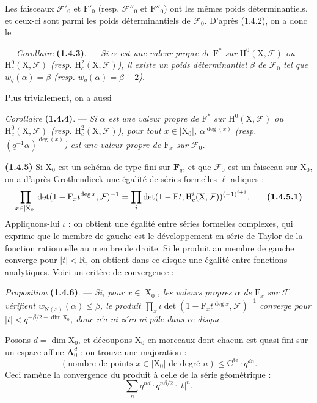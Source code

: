\documentclass[11pt,leqno]{article}
\newcommand{\Page}[1]{\ifvmode\noindent\else\unskip\ \fi{\footnotesize\textcolor{gray}{[p.\,#1]}}\ \ignorespaces}
\begin{document}
Les faisceaux \(\mathcal{F}'_0\) et \(\mathrm{F}'_0\) (resp. \(\mathcal{F}''_0\) et \(\mathrm{F}''_0\)) ont les mêmes poids déterminantiels, et ceux-ci sont parmi les poids déterminantiels de \(\mathcal{F}_0\). D’après (1.4.2), on a donc le

\Page{163}
\textit{Corollaire} \textbf{(1.4.3)}. — \textit{Si \(\alpha\) est une valeur propre de \(\mathrm{F}^*\) sur \(\mathrm{H}^0(\mathrm{X},\mathcal{F})\) ou \(\mathrm{H}_c^0(\mathrm{X},\mathcal{F})\) (resp. \(\mathrm{H}_c^2(\mathrm{X},\mathcal{F})\)), il existe un poids déterminantiel \(\beta\) de \(\mathcal{F}_0\) tel que \(w_q(\alpha)=\beta\) (resp. \(w_q(\alpha)=\beta+2\)).}

Plus trivialement, on a aussi

\textit{Corollaire} \textbf{(1.4.4)}. — \textit{Si \(\alpha\) est une valeur propre de \(\mathrm{F}^*\) sur \(\mathrm{H}^0(\mathrm{X},\mathcal{F})\) ou \(\mathrm{H}_c^0(\mathrm{X},\mathcal{F})\) (resp. \(\mathrm{H}_c^2(\mathrm{X},\mathcal{F})\)), pour tout \(x\in|\mathrm{X}_0|\), \(\alpha^{\deg(x)}\) (resp. \((q^{-1}\alpha)^{\deg(x)}\)) est une valeur propre de \(\mathrm{F}_x\) sur \(\mathcal{F}_0\).}

\textbf{(1.4.5)} Si \(\mathrm{X}_0\) est un schéma de type fini sur \(\mathbf{F}_q\), et que \(\mathcal{F}_0\) est un faisceau sur \(\mathrm{X}_0\), on a d’après Grothendieck une égalité de séries formelles \(\ell\)-adiques :
\[
\prod_{x\in|\mathrm{X}_0|}
\det(1-\mathrm{F}_x t^{\deg x},\mathcal{F})^{-1}
=
\prod_i\det(1-\mathrm{F}t,\mathrm{H}_c^i(\mathrm{X},\mathcal{F}))^{(-1)^{i+1}}.
\tag*{\textbf{(1.4.5.1)}}
\]
Appliquons-lui \(\iota\) : on obtient une égalité entre séries formelles complexes, qui exprime que le membre de gauche est le développement en série de Taylor de la fonction rationnelle au membre de droite. Si le produit au membre de gauche converge pour \(|t|<\mathrm{R}\), on obtient dans ce disque une égalité entre fonctions analytiques. Voici un critère de convergence :

\textit{Proposition} \textbf{(1.4.6)}. — \textit{Si, pour \(x\in|\mathrm{X}_0|\), les valeurs propres \(\alpha\) de \(\mathrm{F}_x\) sur \(\mathcal{F}\) vérifient \(w_{\mathrm{N}(x)}(\alpha)\le\beta\), le produit \(\prod_x\iota\det(1-\mathrm{F}_x t^{\deg x},\mathcal{F})^{-1}\) converge pour \(|t|<q^{-\beta/2-\dim\mathrm{X}_0}\), donc n’a ni zéro ni pôle dans ce disque.}

Posons \(d=\dim\mathrm{X}_0\), et découpons \(\mathrm{X}_0\) en morceaux dont chacun est quasi-fini sur un espace affine \(\mathbf{A}_0^d\) : on trouve une majoration :
\[
(\text{nombre de points }x\in|\mathrm{X}_0|\text{ de degré }n)
\le\mathrm{C}^{\mathrm{te}}\cdot q^{dn}.
\]
Ceci ramène la convergence du produit à celle de la série géométrique :
\[
\sum_n q^{nd}\cdot q^{n\beta/2}\cdot|t|^n.
\]
\end{document}
